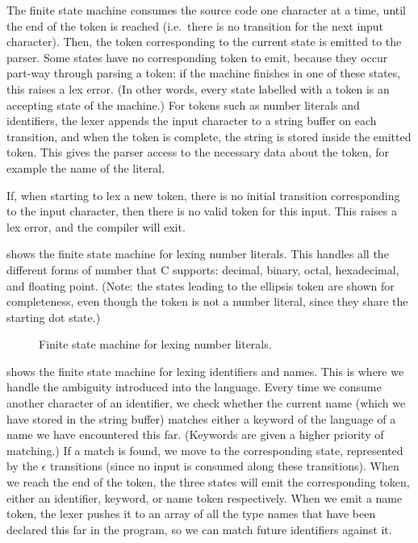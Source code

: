 \documentclass[00-main.tex]{subfiles}
\begin{document}
The finite state machine consumes the source code one character at a time, until the end of the token is reached (i.e.\ there is no transition for the next input character).
Then, the token corresponding to the current state is emitted to the parser.
Some states have no corresponding token to emit, because they occur part-way through parsing a token; if the machine finishes in one of these states, this raises a lex error.
(In other words, every state labelled with a token is an accepting state of the machine.)
For tokens such as number literals and identifiers, the lexer appends the input character to a string buffer on each transition, and when the token is complete, the string is stored inside the emitted token.
This gives the parser access to the necessary data about the token, for example the name of the literal.

If, when starting to lex a new token, there is no initial transition corresponding to the input character, then there is no valid token for this input. This raises a lex error, and the compiler will exit.

 shows the finite state machine for lexing number literals. This handles all the different forms of number that C supports: decimal, binary, octal, hexadecimal, and floating point.
(Note: the states leading to the ellipsis token are shown for completeness, even though the token is not a number literal, since they share the starting dot state.)

\begin{figure}[!htb]
  \centering
  \caption{Finite state machine for lexing number literals.}
  \label{fig:lexing numbers fsm}
\end{figure}

 shows the finite state machine for lexing identifiers and  names.
This is where we handle the ambiguity introduced into the language.
  Every time we consume another character of an identifier, we check whether the current name (which we have stored in the string buffer) matches either a keyword of the language of a  name we have encountered this far.
(Keywords are given a higher priority of matching.)
  If a match is found, we move to the corresponding state, represented by the $\epsilon$ transitions (since no input is consumed along these transitions).
When we reach the end of the token, the three states will emit the corresponding token, either an identifier, keyword, or  name token respectively.
When we emit a  name token, the lexer pushes it to an array of all the type names that have been declared this far in the program, so we can match future identifiers against it.
\end{document}
